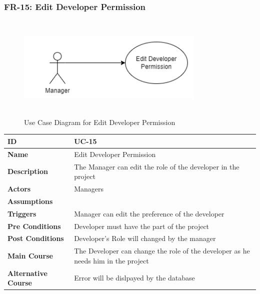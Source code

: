     \subsubsection{FR-15: Edit Developer Permission}
    \begin{figure}[H]
        \includegraphics[height=5cm, width=0.8\textwidth]{./diagrams/Use Case/u15.png}
        \centering 
        \caption{Use Case Diagram for Edit Developer Permission}
        \label{fig:Usecase1}
        \end{figure}
        
    \begin{center}
        \begin{tabularx}{\textwidth}{|l|X|}
            \hline
            \textbf{ID} & UC-15 \\
            \hline
            \textbf{Name} & Edit Developer Permission \\
            \hline
            \textbf{Description} & The Manager can edit the role of the developer in the project \\
            \hline
            \textbf{Actors} & Managers \\
            \hline
            \textbf{Assumptions} &  \\
            \hline
            \textbf{Triggers} & Manager can edit the preference of the developer \\
            \hline
            \textbf{Pre Conditions} & Developer must have the part of the project \\
            \hline
            \textbf{Post Conditions} & Developer's Role will changed by the manager \\
            \hline
            \textbf{Main Course} & The Developer can change the role of the developer as he needs him in the project \\
            \hline
            \textbf{Alternative Course} & Error will be dislpayed by the database \\
            \hline
            
        \end{tabularx}
    \end{center}
    \newpage
    

